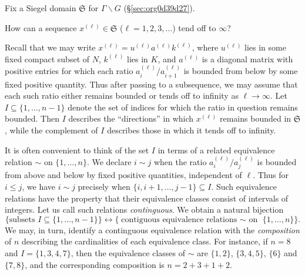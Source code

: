 \documentclass[reqno]{amsart} 
\begin{document}
Fix a Siegel domain $\mathfrak{S}$ for $\Gamma \backslash G$ (\S\ref{sec:org0d39d27}).
\begin{question}
  How can a sequence $x^{(\ell)} \in \mathfrak{S}$ ($\ell=1,2,3,\dotsc$) tend off to $\infty$?
\end{question}
Recall that we may write $x^{(\ell)} = u^{(\ell)} a^{(\ell)} k^{(\ell)}$, where $u^{(\ell)}$ lies in some fixed compact subset of $N$, $k^{(\ell)}$ lies in $K$, and $a^{(\ell)}$ is a diagonal matrix with positive entries for which each ratio $a_i^{(\ell)} / a_{i+1}^{(\ell)}$ is bounded from below by some fixed positive quantity.  Thus after passing to a subsequence, we may assume that each such ratio either remains bounded or tends off to infinity as $\ell \rightarrow \infty$.  Let $I \subseteq \{1, \dotsc, n-1\}$ denote the set of indices for which the ratio in question remains bounded.  Then $I$ describes the ``directions'' in which $x^{(\ell)}$ remains bounded in $\mathfrak{S}$, while the complement of $I$ describes those in which it tends off to infinity.

It is often convenient to think of the set $I$ in terms of a related equivalence relation $\sim$ on $\{1,\dotsc,n\}$.  We declare $i \sim j$ when the ratio $a_i^{(\ell)} / a_j^{(\ell)}$ is bounded from above and below by fixed positive quantities, independent of $\ell$.  Thus for $i \leq j$, we have $i \sim j$ precisely when $\{i,i+1,\dotsc,j-1\} \subseteq I$.  Such equivalence relations have the property that their equivalence classes consist of intervals of integers.  Let us call such relations \emph{continguous}.  We obtain a natural bijection
\begin{equation*}
  \{\text{subsets } I \subseteq \{1,\dotsc,n-1\}\}
  \leftrightarrow
  \{\text{contiguous equivalence relations $\sim$ on } \{1,\dotsc,n \}\}.
\end{equation*}
We may, in turn, identify a continguous equivalence relation with the
\emph{composition} of $n$ describing the cardinalities of each equivalence class.  For instance, if $n = 8$ and $I = \{1,3,4,7\}$, then the equivalence classes of $\sim$ are $\{1,2\}$, $\{3,4,5\}$,  $\{6\}$ and $\{7,8\}$, and the corresponding composition is $n = 2 + 3 + 1 + 2$.
\end{document}
